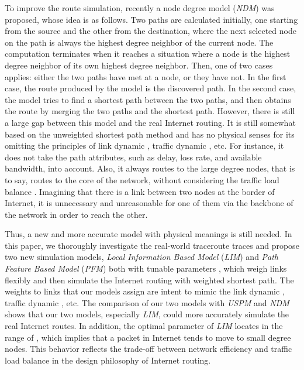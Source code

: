 \documentclass[a4paper]{llncs}
\begin{document}
To improve the route simulation, recently a node degree model (\textit{NDM}) \cite{SimulatingInternetRoute} was proposed, whose idea is as follows. Two paths are calculated initially, one starting from the source and the other from the destination, where the next selected node on the path is always the highest degree neighbor of the current node. The computation terminates when it reaches a situation where a node is the highest degree neighbor of its own highest degree neighbor. Then, one of two cases applies: either the two paths have met at a node, or they have not. In the first case, the route produced by the model is the discovered path. In the second case, the model tries to find a shortest path between the two paths, and then obtains the route by merging the two paths and the shortest path. However, there is still a large gap between this model and the real Internet routing. It is still somewhat based on the unweighted shortest path method and has no physical senses for its omitting the
principles of link dynamic \cite{PathDiversity}, traffic dynamic \cite{TrafficDynamicLocal}, etc. For
instance, it does not take the path attributes, such as delay, loss
rate, and available bandwidth, into account. Also, it always routes
to the large degree nodes, that is to say, routes to the core of the
network, without considering the traffic load balance \cite{LoadBalance,LoadBalance2}. Imagining that
there is a link between two nodes at the border of Internet, it is unnecessary
and unreasonable for one of them via the backbone of the
network in order to reach the other.


Thus, a new and more accurate model with physical meanings is still needed. In this paper, we thoroughly investigate the real-world
traceroute traces and propose two new simulation models, \textit{Local Information Based Model} (\textit{LIM}) and \textit{Path Feature Based Model} (\textit{PFM}) both with tunable parameters , which weigh links flexibly and then simulate the Internet routing with weighted shortest path. The weights to links that our models assign are intent to mimic the link dynamic \cite{PathDiversity}, traffic dynamic \cite{TrafficDynamicLocal}, etc. The comparison of our two models with \textit{USPM} and \textit{NDM} shows that our two models, especially \textit{LIM}, could more accurately simulate the real Internet routes. In addition, the optimal parameter of \textit{LIM} locates in the range of , which implies that a packet in Internet tends to move to small degree nodes. This behavior reflects the trade-off between network efficiency and traffic load balance in the design philosophy of Internet routing.
\end{document}
